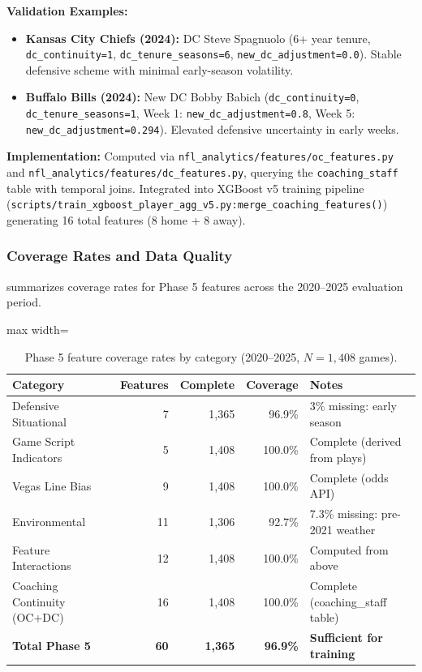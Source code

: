 \noindent\textbf{Validation Examples:}
\begin{itemize}
  \item \textbf{Kansas City Chiefs (2024):} DC Steve Spagnuolo (6+ year tenure, \texttt{dc\_continuity=1}, \texttt{dc\_tenure\_seasons=6}, \texttt{new\_dc\_adjustment=0.0}). Stable defensive scheme with minimal early-season volatility.
  \item \textbf{Buffalo Bills (2024):} New DC Bobby Babich (\texttt{dc\_continuity=0}, \texttt{dc\_tenure\_seasons=1}, Week 1: \texttt{new\_dc\_adjustment=0.8}, Week 5: \texttt{new\_dc\_adjustment=0.294}). Elevated defensive uncertainty in early weeks.
\end{itemize}

\noindent\textbf{Implementation:} Computed via \texttt{nfl\_analytics/features/\allowbreak oc\_features.py} and \texttt{nfl\_analytics/features/\allowbreak dc\_features.py}, querying the \texttt{coaching\_staff} table with temporal joins. Integrated into XGBoost v5 training pipeline (\texttt{scripts/\allowbreak train\_xgboost\_player\_agg\_v5.py:\allowbreak merge\_coaching\_features()}) generating 16 total features (8 home + 8 away).

\subsubsection{Coverage Rates and Data Quality}

 summarizes coverage rates for Phase 5 features across the 2020--2025 evaluation period.

\begin{table}[htbp]
  \centering
  \small
  \caption{Phase 5 feature coverage rates by category (2020--2025, $N=1{,}408$ games).}
  \label{tab:phase5-coverage}
  \begin{adjustbox}{max width=\textwidth}
  \begin{tabular}{@{} l r r r l @{}}
    \toprule
    \textbf{Category} & \textbf{Features} & \textbf{Complete} & \textbf{Coverage} & \textbf{Notes} \\
    \midrule
    Defensive Situational & 7 & 1,365 & 96.9\% & 3\% missing: early season \\
    Game Script Indicators & 5 & 1,408 & 100.0\% & Complete (derived from plays) \\
    Vegas Line Bias & 9 & 1,408 & 100.0\% & Complete (odds API) \\
    Environmental & 11 & 1,306 & 92.7\% & 7.3\% missing: pre-2021 weather \\
    Feature Interactions & 12 & 1,408 & 100.0\% & Computed from above \\
    Coaching Continuity (OC+DC) & 16 & 1,408 & 100.0\% & Complete (coaching\_staff table) \\
    \midrule
    \textbf{Total Phase 5} & \textbf{60} & \textbf{1,365} & \textbf{96.9\%} & \textbf{Sufficient for training} \\
    \bottomrule
  \end{tabular}
  \end{adjustbox}
\end{table}

